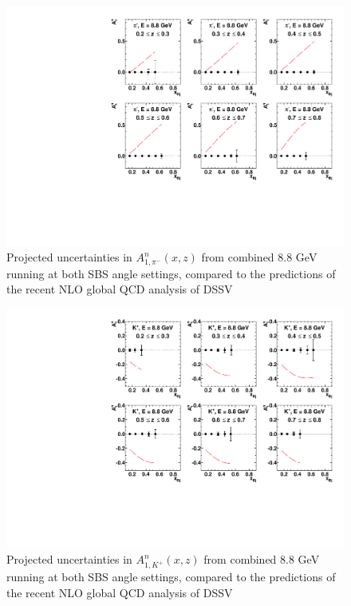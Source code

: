 \begin{figure}[h]
  \begin{center}
    \includegraphics[width=.75\textwidth]{figures/A1n_vs_x_E88_pim.pdf}
  \end{center}
  \caption{\label{A1n_pim_88gev} Projected uncertainties in $A_{1,\pi^-}^{n}(x,z)$ from combined 8.8 GeV running at both SBS angle settings, compared to the predictions of the recent NLO global QCD analysis of DSSV~\cite{DSSVplus}}
\end{figure}


\begin{figure}[h]
  \begin{center}
    \includegraphics[width=.75\textwidth]{figures/A1n_vs_x_E88_kp.pdf}
  \end{center}
  \caption{\label{A1n_kp_88gev} Projected uncertainties in $A_{1,K^+}^{n}(x,z)$ from combined 8.8 GeV running at both SBS angle settings, compared to the predictions of the recent NLO global QCD analysis of DSSV~\cite{DSSVplus}}
\end{figure}

